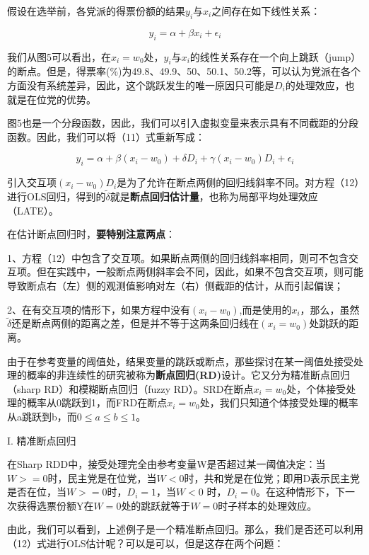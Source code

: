 \documentclass[cn,10pt,math=newtx,citestyle=gb7714-2015,bibstyle=gb7714-2015]{elegantbook}
\begin{document}
	假设在选举前，各党派的得票份额的结果$y_i$与$x_i$之间存在如下线性关系：
	
	\begin{equation}
		y_i=\alpha+\beta{x_i}+\epsilon_i
	\end{equation}
	
	我们从图5可以看出，在$x_i=w_0$处，$y_i$与$x_i$的线性关系存在一个向上跳跃（jump）的断点。但是，得票率(\%)为49.8、49.9、50、50.1、50.2等，可以认为党派在各个方面没有系统差异，因此，这个跳跃发生的唯一原因只可能是$D_i$的处理效应，也就是在位党的优势。
	
	图5也是一个分段函数，因此，我们可以引入虚拟变量来表示具有不同截距的分段函数。因此，我们可以将（11）式重新写成：
	
	\begin{equation}
		y_i=\alpha+\beta{(x_i-w_0)}+\delta{D_i}+\gamma{(x_i-w_0)D_i}+\epsilon_i
	\end{equation}
	
	引入交互项$(x_i-w_0)D_i$是为了允许在断点两侧的回归线斜率不同。对方程（12）进行OLS回归，得到的$\tilde{\delta}$就是\textbf{断点回归估计量}，也称为局部平均处理效应（LATE）。
	
	在估计断点回归时，\textbf{要特别注意两点}：
	
	1、方程（12）中包含了交互项。如果断点两侧的回归线斜率相同，则可不包含交互项。但在实践中，一般断点两侧斜率会不同，因此，如果不包含交互项，则可能导致断点右（左）侧的观测值影响对左（右）侧截距的估计，从而引起偏误；
	
	2、在有交互项的情形下，如果方程中没有$(x_i-w_0)$,而是使用的$x_i$，那么，虽然$\tilde{\delta}$还是断点两侧的距离之差，但是并不等于这两条回归线在$(x_i=w_0)$处跳跃的距离。
	
	由于在参考变量的阈值处，结果变量的跳跃或断点，那些探讨在某一阈值处接受处理的概率的非连续性的研究被称为\textbf{断点回归(RD)}设计。它又分为精准断点回归（sharp RD）和模糊断点回归（fuzzy RD）。SRD在断点$x_i=w_0$处，个体接受处理的概率从0跳跃到1，而FRD在断点$x_i=w_0$处，我们只知道个体接受处理的概率从a跳跃到b，而$0\le{a}\le{b}\le{1}$。
	
	I. 精准断点回归
	
	在Sharp RDD中，接受处理完全由参考变量W是否超过某一阈值决定：当$W>=0$时，民主党是在位党，当$W<0$时，共和党是在位党；即用D表示民主党是否在位，当$W>=0$时，$D_i=1$，当$W<0$ 时，$D_i=0$。在这种情形下，下一次获得选票份额Y在$W=0$处的跳跃就等于$W=0$时子样本的处理效应。
	
	由此，我们可以看到，上述例子是一个精准断点回归。那么，我们是否还可以利用（12）式进行OLS估计呢？可以是可以，但是这存在两个问题：
	
\end{document}
